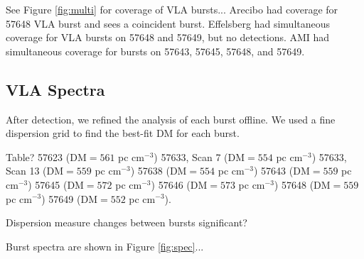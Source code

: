 \documentclass{emulateapj}
\begin{document}
See Figure \ref{fig:multi} for coverage of VLA bursts... Arecibo had coverage for 57648 VLA burst and sees a coincident burst. Effelsberg had simultaneous coverage for VLA bursts on 57648 and 57649, but no detections. AMI had simultaneous coverage for bursts on 57643, 57645, 57648, and 57649.


\subsection{VLA Spectra}
After detection, we refined the analysis of each burst offline. We used a fine dispersion grid to find the best-fit DM for each burst.

Table?
57623 (DM$=561$ pc cm$^{-3}$)
57633, Scan 7 (DM$=554$ pc cm$^{-3}$)
57633, Scan 13 (DM$=559$ pc cm$^{-3}$)
57638 (DM$=554$ pc cm$^{-3}$)
57643 (DM$=559$ pc cm$^{-3}$)
57645 (DM$=572$ pc cm$^{-3}$)
57646 (DM$=573$ pc cm$^{-3}$)
57648 (DM$=559$ pc cm$^{-3}$)
57649 (DM$=552$ pc cm$^{-3}$).

Dispersion measure changes between bursts significant?

Burst spectra are shown in Figure \ref{fig:spec}...
\end{document}
